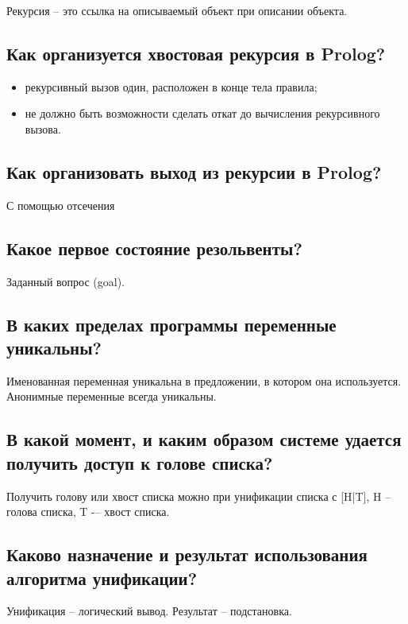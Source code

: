 Рекурсия – это ссылка на описываемый объект при описании объекта.

\subsection*{Как организуется хвостовая рекурсия в Prolog?}

\begin{itemize}
    \item рекурсивный вызов один, расположен в конце тела правила;
    \item не должно быть возможности сделать откат до вычисления рекурсивного вызова.
\end{itemize}

\subsection*{Как организовать выход из рекурсии в Prolog?}

С помощью отсечения

\subsection*{Какое первое состояние резольвенты?}

Заданный вопрос (goal).

\subsection*{В каких пределах программы переменные уникальны?}

Именованная переменная уникальна в предложении, в котором она используется. Анонимные переменные всегда уникальны.

\subsection*{В какой момент, и каким образом системе удается получить доступ к голове списка?}

Получить голову или хвост списка можно при унификации списка с [H|T], H -- голова списка, T -– хвост списка.

\subsection*{Каково назначение и результат использования алгоритма унификации?}

Унификация – логический вывод. Результат – подстановка.

